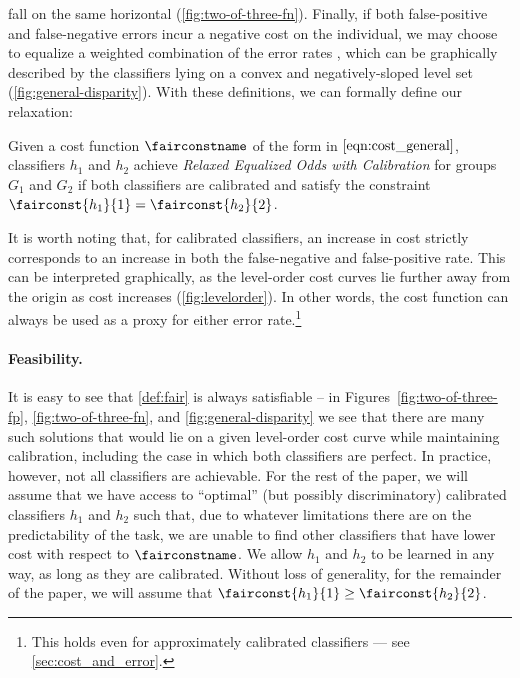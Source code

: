 fall on the same horizontal (\autoref{fig:two-of-three-fn}).
%
Finally, if both false-positive and false-negative errors
incur a negative cost on the individual, we may choose to equalize a weighted
combination of the error rates \cite{berk2016primer,berk2017fairness,chouldechova2017fair},
which can be graphically described by the classifiers lying on a convex and negatively-sloped level set
(\autoref{fig:general-disparity}).
With these definitions,
we can formally define our relaxation:
%
\begin{definition}
  \label{def:fair}
  Given a cost function $\fairconstname$ of the form in $\eqref{eqn:cost_general}$,
  classifiers $h_1$ and $h_2$ achieve \emph{Relaxed Equalized Odds with
  Calibration} for groups $G_1$ and $G_2$ if both classifiers
  are calibrated and satisfy the constraint $\fairconst{h_1}{1} =
  \fairconst{h_2}{2}$.
\end{definition}
%
It is worth noting that, for calibrated classifiers, an increase in cost
strictly corresponds to an increase in both the false-negative and
false-positive rate. This can be interpreted graphically, as the level-order cost
curves lie further away from the origin as cost increases (\autoref{fig:levelorder}). In other words,
the cost function can always be used as a proxy for either error rate.\footnote{
  This holds even for approximately calibrated classifiers ---  see \autoref{sec:cost_and_error}.
}

\paragraph{Feasibility.}
It is easy to see that \autoref{def:fair} is always satisfiable -- in
Figures~\ref{fig:two-of-three-fp}, \ref{fig:two-of-three-fn}, and \ref{fig:general-disparity}
we see that there are many such solutions that would lie on a given level-order
cost curve while maintaining calibration, including the case in which both
classifiers are perfect.  In
practice, however, not all classifiers are achievable. For the rest of
the paper, we will assume that we have access to ``optimal'' (but possibly
discriminatory) calibrated
classifiers $h_1$ and $h_2$ such that, due to whatever limitations there are on
the predictability of the task, we are unable to find other classifiers that
have lower cost with respect to $\fairconstname$.
%
We allow $h_1$ and
$h_2$ to be learned in any way, as long as they are calibrated. Without loss of
generality, for the remainder of the paper, we will assume that
$\fairconst{h_1}{1} \ge \fairconst{h_2}{2}$.


